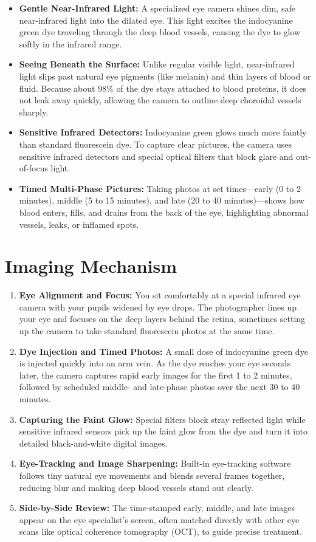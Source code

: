 \begin{itemize}
    \item \textbf{Gentle Near-Infrared Light:} A specialized eye camera shines dim, safe near-infrared light into the dilated eye. This light excites the indocyanine green dye traveling through the deep blood vessels, causing the dye to glow softly in the infrared range.
    \item \textbf{Seeing Beneath the Surface:} Unlike regular visible light, near-infrared light slips past natural eye pigments (like melanin) and thin layers of blood or fluid. Because about 98\% of the dye stays attached to blood proteins, it does not leak away quickly, allowing the camera to outline deep choroidal vessels sharply.
    \item \textbf{Sensitive Infrared Detectors:} Indocyanine green glows much more faintly than standard fluorescein dye. To capture clear pictures, the camera uses sensitive infrared detectors and special optical filters that block glare and out-of-focus light.
    \item \textbf{Timed Multi-Phase Pictures:} Taking photos at set times---early (0 to 2 minutes), middle (5 to 15 minutes), and late (20 to 40 minutes)---shows how blood enters, fills, and drains from the back of the eye, highlighting abnormal vessels, leaks, or inflamed spots.
\end{itemize}

\section{Imaging Mechanism}

\begin{enumerate}
    \item \textbf{Eye Alignment and Focus:} You sit comfortably at a special infrared eye camera with your pupils widened by eye drops. The photographer lines up your eye and focuses on the deep layers behind the retina, sometimes setting up the camera to take standard fluorescein photos at the same time.
    \item \textbf{Dye Injection and Timed Photos:} A small dose of indocyanine green dye is injected quickly into an arm vein. As the dye reaches your eye seconds later, the camera captures rapid early images for the first 1 to 2 minutes, followed by scheduled middle- and late-phase photos over the next 30 to 40 minutes.
    \item \textbf{Capturing the Faint Glow:} Special filters block stray reflected light while sensitive infrared sensors pick up the faint glow from the dye and turn it into detailed black-and-white digital images.
    \item \textbf{Eye-Tracking and Image Sharpening:} Built-in eye-tracking software follows tiny natural eye movements and blends several frames together, reducing blur and making deep blood vessels stand out clearly.
    \item \textbf{Side-by-Side Review:} The time-stamped early, middle, and late images appear on the eye specialist's screen, often matched directly with other eye scans like optical coherence tomography (OCT), to guide precise treatment.
\end{enumerate}

